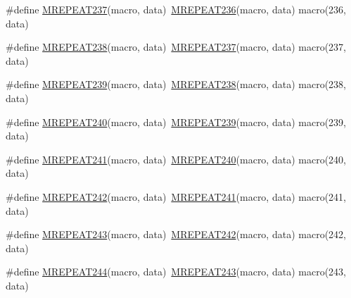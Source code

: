 \begin{DoxyCompactItemize}
\item 
\#define \mbox{\hyperlink{group__group__sam0__utils__mrepeat_ga0e49a6a0b3047b2d3ec37912f6f15c7a}{M\+R\+E\+P\+E\+A\+T237}}(macro,  data)~\mbox{\hyperlink{group__group__sam0__utils__mrepeat_ga91157712363f58affa1ae6b2feb50747}{M\+R\+E\+P\+E\+A\+T236}}(macro, data)   macro(236, data)
\item 
\#define \mbox{\hyperlink{group__group__sam0__utils__mrepeat_ga22a583e1c58865d54827789830f38953}{M\+R\+E\+P\+E\+A\+T238}}(macro,  data)~\mbox{\hyperlink{group__group__sam0__utils__mrepeat_ga0e49a6a0b3047b2d3ec37912f6f15c7a}{M\+R\+E\+P\+E\+A\+T237}}(macro, data)   macro(237, data)
\item 
\#define \mbox{\hyperlink{group__group__sam0__utils__mrepeat_gac7ec468a3f485459ffcac683dd035e65}{M\+R\+E\+P\+E\+A\+T239}}(macro,  data)~\mbox{\hyperlink{group__group__sam0__utils__mrepeat_ga22a583e1c58865d54827789830f38953}{M\+R\+E\+P\+E\+A\+T238}}(macro, data)   macro(238, data)
\item 
\#define \mbox{\hyperlink{group__group__sam0__utils__mrepeat_ga88afce60134e666d2674813cc05b06aa}{M\+R\+E\+P\+E\+A\+T240}}(macro,  data)~\mbox{\hyperlink{group__group__sam0__utils__mrepeat_gac7ec468a3f485459ffcac683dd035e65}{M\+R\+E\+P\+E\+A\+T239}}(macro, data)   macro(239, data)
\item 
\#define \mbox{\hyperlink{group__group__sam0__utils__mrepeat_gac11f0502fa2d597c4b9a18351f87384a}{M\+R\+E\+P\+E\+A\+T241}}(macro,  data)~\mbox{\hyperlink{group__group__sam0__utils__mrepeat_ga88afce60134e666d2674813cc05b06aa}{M\+R\+E\+P\+E\+A\+T240}}(macro, data)   macro(240, data)
\item 
\#define \mbox{\hyperlink{group__group__sam0__utils__mrepeat_gae6db0e42b34f92c59c76e0364573db92}{M\+R\+E\+P\+E\+A\+T242}}(macro,  data)~\mbox{\hyperlink{group__group__sam0__utils__mrepeat_gac11f0502fa2d597c4b9a18351f87384a}{M\+R\+E\+P\+E\+A\+T241}}(macro, data)   macro(241, data)
\item 
\#define \mbox{\hyperlink{group__group__sam0__utils__mrepeat_ga3780c0d880e8f0fef0b734f8491388a1}{M\+R\+E\+P\+E\+A\+T243}}(macro,  data)~\mbox{\hyperlink{group__group__sam0__utils__mrepeat_gae6db0e42b34f92c59c76e0364573db92}{M\+R\+E\+P\+E\+A\+T242}}(macro, data)   macro(242, data)
\item 
\#define \mbox{\hyperlink{group__group__sam0__utils__mrepeat_ga96b96568f137828bd94f1df72f9ea533}{M\+R\+E\+P\+E\+A\+T244}}(macro,  data)~\mbox{\hyperlink{group__group__sam0__utils__mrepeat_ga3780c0d880e8f0fef0b734f8491388a1}{M\+R\+E\+P\+E\+A\+T243}}(macro, data)   macro(243, data)

\end{DoxyCompactItemize}
